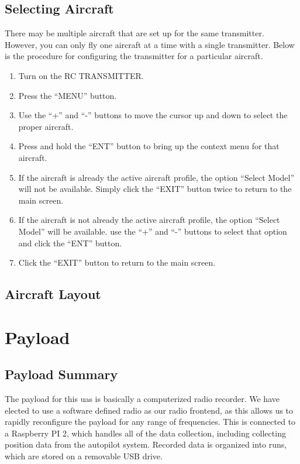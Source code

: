 \documentclass{report}
\begin{document}
			\subsection{Selecting Aircraft}
				There may be multiple aircraft that are set up for the same transmitter.  However, you can only fly one aircraft at a time with a single transmitter.  Below is the procedure for configuring the transmitter for a particular aircraft.
				\begin{enumerate}
					\item Turn on the RC TRANSMITTER.
					\item Press the ``MENU'' button.
					\item Use the ``+'' and ``-'' buttons to move the cursor up and down to select the proper aircraft.
					\item Press and hold the ``ENT'' button to bring up the context menu for that aircraft.
					\item If the aircraft is already the active aircraft profile, the option ``Select Model'' will not be available.  Simply click the ``EXIT'' button twice to return to the main screen.
					\item If the aircraft is not already the active aircraft profile, the option ``Select Model'' will be available.  use the ``+'' and ``-'' buttons to select that option and click the ``ENT'' button.
					\item Click the ``EXIT'' button to return to the main screen.
				\end{enumerate}
		\subsection{Aircraft Layout}
	\section{Payload}
		\subsection{Payload Summary}
			The payload for this \gls{uas} is basically a computerized radio recorder.  We have elected to use a software defined radio as our radio frontend, as this allows us to rapidly reconfigure the payload for any range of frequencies.  This is connected to a Raspberry PI 2, which handles all of the data collection, including collecting position data from the autopilot system.  Recorded data is organized into runs, which are stored on a removable USB drive.
\end{document}
